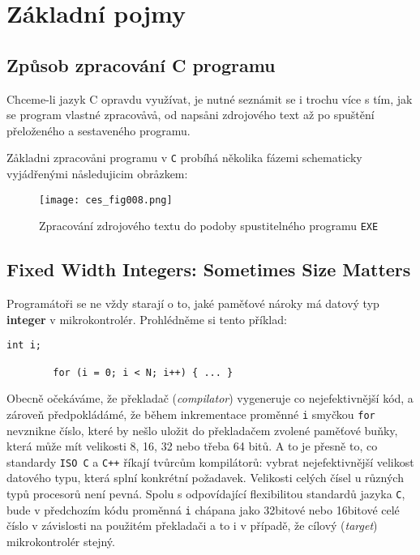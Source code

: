   \newpage
  \section{Základní pojmy}
    \subsection{Způsob zpracování C programu}
      Chceme-li jazyk C opravdu využívat, je nutné seznámit se i trochu více s tím, jak se program 
      vlastné zpracovåvå, od napsåni zdrojového text až po spuštění přeloženého a sestaveného 
      programu.
      
      Zåkladni zpracovåni programu v \texttt{C} probíhá několika fázemi schematicky vyjádřenými 
      nåsledujicim obråzkem: 

      \begin{figure}[ht!]  %
        \centering
        \texttt{[image: ces\_fig008.png]}
        \caption{Zpracování zdrojového textu do podoby spustitelného programu \texttt{EXE}}
        \label{ces:fig008}
      \end{figure}
      
    \subsection{Fixed Width Integers: Sometimes Size Matters}
      Programátoři se ne vždy starají o to, jaké paměťové nároky má datový typ \textbf{integer} v 
      mikrokontrolér. Prohlédněme si tento příklad:
      \begin{lstlisting}[gobble=8, xrightmargin=13em]
        int i; 
        
        for (i = 0; i < N; i++) { ... } 
      \end{lstlisting}
      Obecně očekáváme, že překladač (\emph{compilator}) vygeneruje co nejefektivnější kód, a 
      zároveň předpokládámé, že během inkrementace proměnné \texttt{i} smyčkou 
      \lstinline[basicstyle=\ttfamily]!for! nevznikne číslo, které by nešlo uložit do překladačem 
      zvolené paměťové buňky, která může mít velikosti 8, 16, 32 nebo třeba 64 bitů. A to je přesně 
      to, co standardy \texttt{ISO C} a  \texttt{C++} říkají tvůrcům kompilátorů: vybrat 
      nejefektivnější velikost datového typu, která splní konkrétní požadavek. Velikosti celých 
      čísel u různých typů procesorů není pevná. Spolu s odpovídající flexibilitou standardů jazyka 
      \texttt{C}, bude v předchozím kódu proměnná \texttt{i} chápana jako 32bitové nebo 16bitové 
      celé číslo v závislosti na použitém překladači a to i v případě, že cílový (\emph{target}) 
      mikrokontrolér stejný.
      
